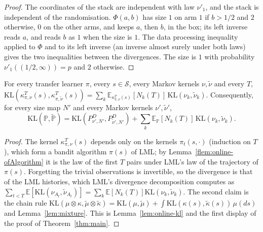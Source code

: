 \documentclass[11pt]{article}
\newcommand{\E}{\mathbb{E}}
\begin{document}
\begin{proof}
The coordinates of the stack are independent with law $\nu'_1$, and the stack is independent of
the randomisation. $\Phi(a,b)$ has size $1$ on arm $1$ if $b>1/2$ and $2$ otherwise, $0$ on the
other arms, and keeps $a$, then $b$, in the box; its left inverse reads $a$, and reads $b$ as $1$
when the size is $1$. The data processing inequality applied to $\Phi$ and to its left inverse (an
inverse almost surely under both laws) gives the two inequalities between the divergences. The
size is $1$ with probability $\nu'_1((1/2,\infty))=p$ and $2$ otherwise.
\end{proof}

\begin{lemma}\label{flem:online-kl-chain}
For every transfer learner $\pi$, every $s\in\mathcal S$, every Markov kernels $\nu,\tilde\nu$ and
every $T$, $\mathrm{KL}(\kappa^T_{\pi,\nu}(s),\kappa^T_{\pi,\tilde\nu}(s))=\sum_k
\E_{\kappa^T_{\pi,\nu}(s)}[N_k(T)]\,\mathrm{KL}(\nu_k,\tilde\nu_k)$. Consequently, for every size map
$N'$ and every Markov kernels $\nu',\tilde\nu'$,
\[
\mathrm{KL}(\mathbb P,\tilde{\mathbb P})=\mathrm{KL}(P^D_{\nu',N'},P^D_{\tilde\nu',N'})
+\sum_k\E_{\mathbb P}[N_k(T)]\,\mathrm{KL}(\nu_k,\tilde\nu_k).
\]
\end{lemma}

\begin{proof}
The kernel $\kappa^T_{\pi,\nu}(s)$ depends only on the kernels $\pi_t(s,\cdot)$ (induction on $T$),
which form a bandit algorithm $\pi(s)$ of LML; by Lemma~\ref{flem:online-ofAlgorithm} it is the law
of the first $T$ pairs under LML's law of the trajectory of $\pi(s)$. Forgetting the trivial
observations is invertible, so the divergence is that of the LML histories, which LML's divergence
decomposition computes as $\sum_{t<T}\E[\mathrm{KL}(\nu_{A_t},\tilde\nu_{A_t})]
=\sum_k\E[N_k(T)]\mathrm{KL}(\nu_k,\tilde\nu_k)$. The second claim is the chain rule
$\mathrm{KL}(\mu\otimes\kappa,\tilde\mu\otimes\tilde\kappa)=\mathrm{KL}(\mu,\tilde\mu)
+\int\mathrm{KL}(\kappa(s),\tilde\kappa(s))\,\mu(ds)$ and Lemma~\ref{lem:mixture}. This is
Lemma~\ref{lem:online-kl} and the first display of the proof of Theorem~\ref{thm:main}.
\end{proof}
\end{document}
